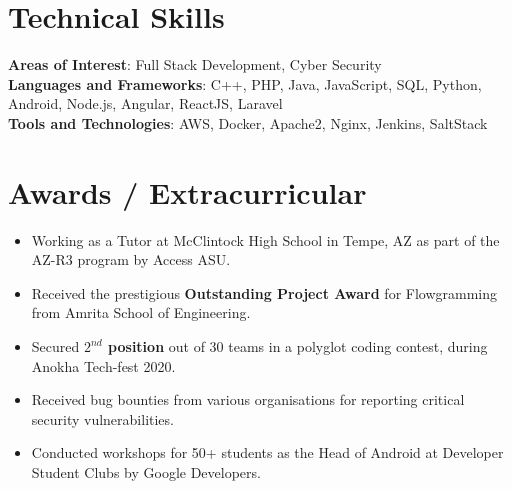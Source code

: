 \documentclass[letterpaper,11pt]{article}
\newcommand{\resumeItem}[1]{
  \item\small{
    {#1 \vspace{-2pt}}
  }
}
\newcommand{\resumeItemListStart}{\begin{itemize}}
\newcommand{\resumeItemListEnd}{\end{itemize}\vspace{-5pt}}
\begin{document}
%
\section{Technical Skills}
 \begin{itemize}[leftmargin=0.15in, label={}]
    \small{\item{
    \textbf{Areas of Interest}{: Full Stack Development, Cyber Security} \\
     \textbf{Languages and Frameworks}{: C++, PHP, Java, JavaScript, SQL, Python, Android, Node.js, Angular, ReactJS, Laravel} \\
     \textbf{Tools and Technologies}{: AWS, Docker, Apache2, Nginx, Jenkins, SaltStack} \\
    }}
 \end{itemize}
 \vspace{-10pt}


\section{Awards / Extracurricular}
            \resumeItemListStart
                        	\resumeItem{Working as a Tutor at McClintock High School in Tempe, AZ as part of the AZ-R3 program by Access ASU.}\vspace{-5pt}
            	\resumeItem{Received the prestigious \textbf{Outstanding Project Award} for Flowgramming from Amrita School of Engineering.}\vspace{-5pt}
                \resumeItem{Secured \textbf{{$2^{nd}$} position} out of 30 teams in a polyglot coding contest, during Anokha Tech-fest 2020.}\vspace{-5pt}
                \resumeItem{Received bug bounties from various organisations for reporting critical security vulnerabilities.}\vspace{-5pt}
                \resumeItem{Conducted workshops for 50+ students as the Head of Android at Developer Student Clubs by Google Developers.}\vspace{-5pt}
            \resumeItemListEnd
\end{document}
